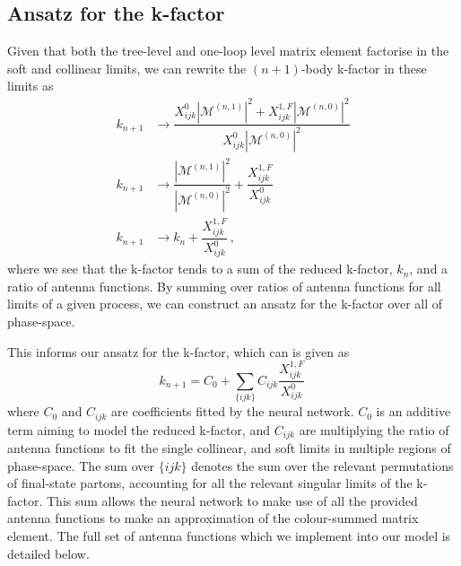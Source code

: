 \documentclass[main.tex]{subfiles}
\begin{document}
\subsection{Ansatz for the k-factor}\label{sec:1L_ansatz}
Given that both the tree-level and one-loop level matrix
element factorise in the soft and collinear limits,
we can rewrite the $(n+1)$-body k-factor in these limits as
\begin{align}
    k_{n+1} &\longrightarrow \dfrac{X_{ijk}^{0} |\mathcal{M}^{(n, 1)}|^{2} + X_{ijk}^{1,F} |\mathcal{M}^{(n, 0)}|^{2}}{X_{ijk}^{0} |\mathcal{M}^{(n, 0)}|^{2}} \nonumber \\
    k_{n+1} &\longrightarrow \dfrac{|\mathcal{M}^{(n, 1)}|^{2}}{|\mathcal{M}^{(n, 0)}|^{2}} + \dfrac{X_{ijk}^{1,F}}{X_{ijk}^{0}} \\
    k_{n+1} &\longrightarrow k_{n} + \dfrac{X_{ijk}^{1,F}}{X_{ijk}^{0}} \nonumber \, ,
    \label{eq:k_factorisation}
\end{align}
where we see that the k-factor tends to a sum
of the reduced k-factor, $k_{n}$, and a ratio
of antenna functions. By summing over ratios of
antenna functions for all limits of a
given process, we can construct an ansatz for the
k-factor over all of phase-space.

This informs our ansatz for the k-factor, which can is given as
\begin{equation}
    k_{n+1} = C_{0} + \sum_{\{ijk\}} C_{ijk}\dfrac{X_{ijk}^{1,F}}{X_{ijk}^{0}} \,
    \label{eq:1L_ansatz}
\end{equation}
where $C_{0}$ and $C_{ijk}$ are coefficients fitted by the neural network.
$C_{0}$ is an additive term aiming to model the reduced
k-factor, and $C_{ijk}$ are multiplying the ratio of
antenna functions to fit the single collinear, and
soft limits in multiple regions of phase-space.
The sum over $\{ijk\}$ denotes the sum over
the relevant permutations of final-state partons, accounting
for all the relevant singular limits of the k-factor.
This sum allows the neural network to make use of all
the provided antenna functions to make an approximation
of the colour-summed matrix element.
The full set of antenna functions which we implement into our
model is detailed below.
\end{document}
